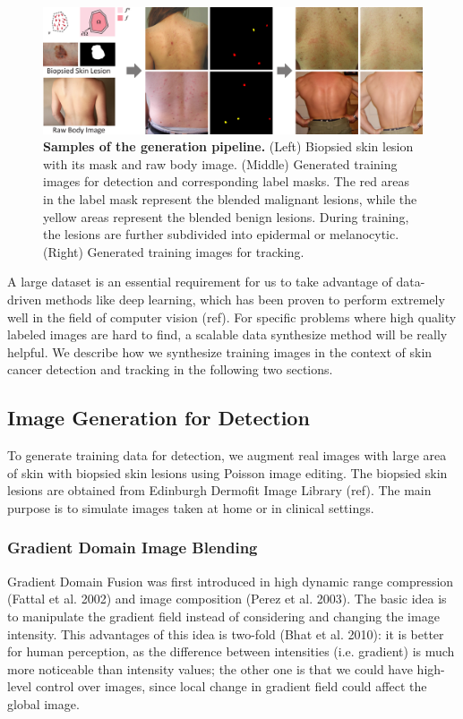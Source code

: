 \documentclass[letterpaper]{article}
\begin{document}
\begin{figure}[h!]
  \centering
  \includegraphics[width=\textwidth]{./blend.pdf}
  \caption{{\bf Samples of the generation pipeline.} (Left) Biopsied skin lesion with its mask and raw body image. (Middle) Generated training images for detection and corresponding label masks. The red areas in the label mask represent the blended malignant lesions, while the yellow areas represent the blended benign lesions. During training, the lesions are further subdivided into epidermal or melanocytic. (Right) Generated training images for tracking.}
  \label{fig:poisson}
\end{figure}

A large dataset is an essential requirement for us to take advantage of data-driven methods like deep learning, which has been proven to perform extremely well in the field of computer vision (ref). For specific problems where high quality labeled images are hard to find, a scalable data synthesize method will be really helpful. We describe how we synthesize training images in the context of skin cancer detection and tracking in the following two sections.

\subsection{Image Generation for Detection}

To generate training data for detection, we augment real images with large area of skin with biopsied skin lesions using Poisson image editing. The biopsied skin lesions are obtained from Edinburgh Dermofit Image Library (ref). The main purpose is to simulate images taken at home or in clinical settings.

\subsubsection{Gradient Domain Image Blending}

Gradient Domain Fusion was first introduced in high dynamic range compression (Fattal et al. 2002) and image composition (Perez et al. 2003). The basic idea is to manipulate the gradient field instead of considering and changing the image intensity. This advantages of this idea is two-fold (Bhat et al. 2010): it is better for human perception, as the difference between intensities (i.e. gradient) is much more noticeable than intensity values; the other one is that we could have high-level control over images, since local change in gradient field could affect the global image.
\end{document}
